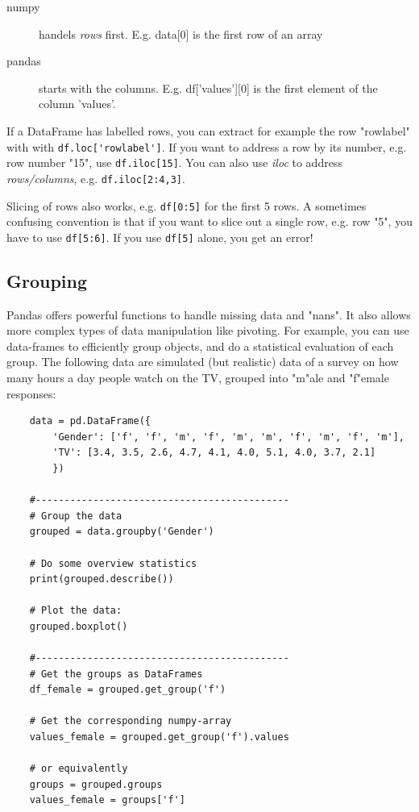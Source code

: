 \begin{description}
  \item[numpy] handels \emph{rows} first. E.g. data[0] is the first row of an array
  \item[pandas] starts with the columns. E.g. df['values'][0] is the first element of the column 'values'.
\end{description}

If a DataFrame has labelled rows, you can extract for example the row "rowlabel" with with \lstinline{df.loc['rowlabel']}. If you want to address a row by its number, e.g. row number "15", use \lstinline{df.iloc[15]}. You can also use \emph{iloc} to address \emph{rows/columns}, e.g. \lstinline{df.iloc[2:4,3]}.

Slicing of rows also works, e.g. \lstinline{df[0:5]} for the first 5 rows. A sometimes confusing convention is that if you want to slice out a single row, e.g. row "5", you have to use \lstinline{df[5:6]}. If you use \lstinline{df[5]} alone, you get an error!

\subsection{Grouping}

Pandas offers powerful functions to handle missing data and "nans". It also allows more complex types of data manipulation like pivoting.
For example, you can use data-frames to efficiently group objects, and do a statistical evaluation of each group. The following data are simulated (but realistic) data of a survey on how many hours a day people watch on the TV, grouped into "m"ale and "f"emale responses:

\begin{lstlisting}
    data = pd.DataFrame({
        'Gender': ['f', 'f', 'm', 'f', 'm', 'm', 'f', 'm', 'f', 'm'],
        'TV': [3.4, 3.5, 2.6, 4.7, 4.1, 4.0, 5.1, 4.0, 3.7, 2.1]
        })

    #--------------------------------------------
    # Group the data
    grouped = data.groupby('Gender')

    # Do some overview statistics
    print(grouped.describe())

    # Plot the data:
    grouped.boxplot()

    #--------------------------------------------
    # Get the groups as DataFrames
    df_female = grouped.get_group('f')

    # Get the corresponding numpy-array
    values_female = grouped.get_group('f').values

    # or equivalently
    groups = grouped.groups
    values_female = groups['f']

\end{lstlisting}

